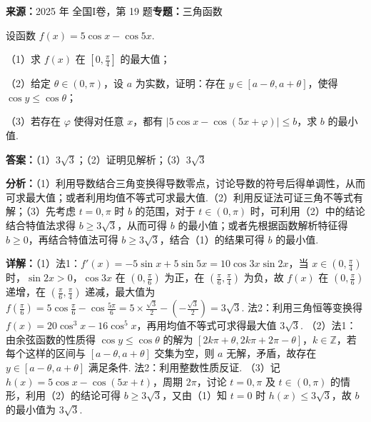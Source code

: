 \begin{question}[points=17]
\textbf{来源：}2025 年 全国I卷，第 19 题\quad \textbf{专题：}三角函数\par
设函数 $f(x) = 5\cos x - \cos 5x$.



（1）求 $f(x)$ 在 $\left[0, \frac{\pi}{4}\right]$ 的最大值；



（2）给定 $\theta \in (0,\pi)$，设 $a$ 为实数，证明：存在 $y \in [a-\theta, a+\theta]$，使得 $\cos y \le \cos \theta$；



（3）若存在 $\varphi$ 使得对任意 $x$，都有 $|5\cos x - \cos(5x+\varphi)| \le b$，求 $b$ 的最小值.
\begin{solution}
\textbf{答案：}（1）$3\sqrt{3}$；（2）证明见解析；（3）$3\sqrt{3}$

\textbf{分析：}（1）利用导数结合三角变换得导数零点，讨论导数的符号后得单调性，从而可求最大值；或者利用均值不等式可求最大值.（2）利用反证法可证三角不等式有解；（3）先考虑 $t=0,\pi$ 时 $b$ 的范围，对于 $t \in (0,\pi)$ 时，可利用（2）中的结论结合特值法求得 $b \ge 3\sqrt{3}$，从而可得 $b$ 的最小值；或者先根据函数解析特征得 $b \ge 0$，再结合特值法可得 $b \ge 3\sqrt{3}$，结合（1）的结果可得 $b$ 的最小值.

\textbf{详解：}（1）法1：$f'(x) = -5\sin x + 5\sin 5x = 10\cos 3x \sin 2x$，当 $x \in (0,\frac{\pi}{4})$ 时，$\sin 2x > 0$，$\cos 3x$ 在 $(0,\frac{\pi}{6})$ 为正，在 $(\frac{\pi}{6},\frac{\pi}{4})$ 为负，故 $f(x)$ 在 $(0,\frac{\pi}{6})$ 递增，在 $(\frac{\pi}{6},\frac{\pi}{4})$ 递减，最大值为 $f(\frac{\pi}{6}) = 5\cos\frac{\pi}{6} - \cos\frac{5\pi}{6} = 5\times\frac{\sqrt{3}}{2} - (-\frac{\sqrt{3}}{2}) = 3\sqrt{3}$. 法2：利用三角恒等变换得 $f(x)=20\cos^3 x - 16\cos^5 x$，再用均值不等式可求得最大值 $3\sqrt{3}$.
（2）法1：由余弦函数的性质得 $\cos y \le \cos\theta$ 的解为 $[2k\pi+\theta, 2k\pi+2\pi-\theta]$，$k \in \mathbb{Z}$，若每个这样的区间与 $[a-\theta, a+\theta]$ 交集为空，则 $a$ 无解，矛盾，故存在 $y \in [a-\theta, a+\theta]$ 满足条件. 法2：利用整数性质反证.
（3）记 $h(x)=5\cos x - \cos(5x+t)$，周期 $2\pi$，讨论 $t=0,\pi$ 及 $t \in (0,\pi)$ 的情形，利用（2）的结论可得 $b \ge 3\sqrt{3}$，又由（1）知 $t=0$ 时 $h(x) \le 3\sqrt{3}$，故 $b$ 的最小值为 $3\sqrt{3}$.
\end{solution}
\end{question}

